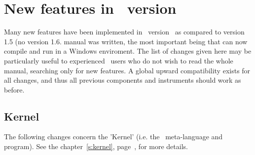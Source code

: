 
\chapter{New features in \MCS\ version \version\ }
\label{c:changes}

Many new features have been implemented in \MCS\ version \version\ 
as compared to version 1.5 (no version 1.6. manual was written,
the most important being that \MCS can now compile and run in
a Windows enviroment. 
The list of changes given here may be particularly 
useful to experienced \MCS\ users who do not wish to read the whole 
manual, searching only for new features. A global upward compatibility 
exists for all changes, and thus all previous components and 
instruments should work as before. 

\section{Kernel} 
\label{s:new-features:kernel}

The following changes concern the 'Kernel' (i.e. the \MCS\ meta-language and program). See the chapter~\ref{s:kernel}, page~\pageref{s:kernel}, for more details.

